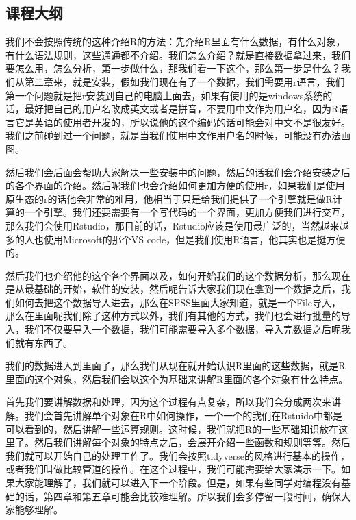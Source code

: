 \documentclass[
  oneside]{book}
\begin{document}
\hypertarget{ux8bfeux7a0bux5927ux7eb2}{%
\subsection{课程大纲}\label{ux8bfeux7a0bux5927ux7eb2}}

我们不会按照传统的这种介绍R的方法：先介绍R里面有什么数据，有什么对象，有什么语法规则，这些通通都不介绍。我们怎么介绍？就是直接数据拿过来，我们要怎么用，怎么分析，第一步做什么，那我们看一下这个，那么第一步是什么？我们从第二章来，就是安装，假如我们现在有了一个数据，我们需要用r语言，我们第一个问题就是把r安装到自己的电脑上面去，如果有使用的是windows系统的话，最好把自己的用户名改成英文或者是拼音，不要用中文作为用户名，因为R语言它是英语的使用者开发的，所以说他的这个编码的话可能会对中文不是很友好。我们之前碰到过一个问题，就是当我们使用中文作用户名的时候，可能没有办法画图。

然后我们会后面会帮助大家解决一些安装中的问题，然后的话我们会介绍安装之后的各个界面的介绍。然后呢我们也会介绍如何更加方便的使用r，如果我们是使用原生态的r的话他会非常的难用，他相当于只是给我们提供了一个引擎就是做R计算的一个引擎。我们还要需要有一个写代码的一个界面，更加方便我们进行交互，那么我们会使用Rstudio，那目前的话，Rstudio应该是使用最广泛的，当然越来越多的人也使用Microsoft的那个VS
code，但是我们使用R语言，他其实也是挺方便的。

然后我们也介绍他的这个各个界面以及，如何开始我们的这个数据分析，那么现在是从最基础的开始，软件的安装，然后呢告诉大家我们现在拿到一个数据之后，我们如何去把这个数据导入进去，那么在SPSS里面大家知道，就是一个File导入，那么在里面呢我们除了这种方式以外，我们有其他的方式，我们也会进行批量的导入，我们不仅要导入一个数据，我们可能需要导入多个数据，导入完数据之后呢我们就有东西了。

我们的数据进入到里面了，那么我们从现在就开始认识R里面的这些数据，就是R里面的这个对象，然后我们会以这个为基础来讲解R里面的各个对象有什么特点。

首先我们要讲解数据和处理，因为这个过程有点复杂，所以我们会分成两次来讲解。我们会首先讲解单个对象在R中如何操作，一个一个的我们在Rstuido中都是可以看到的，然后讲解一些运算规则。这时候，我们就把R的一些基础知识放在这里了。然后我们讲解每个对象的特点之后，会展开介绍一些函数和规则等等。然后我们就可以开始自己的处理工作了。我们会按照tidyverse的风格进行基本的操作，或者我们叫做比较管道的操作。在这个过程中，我们可能需要给大家演示一下。如果大家能理解了，我们就可以进入下一个阶段。但是，如果有些同学对编程没有基础的话，第四章和第五章可能会比较难理解。所以我们会多停留一段时间，确保大家能够理解。
\end{document}
